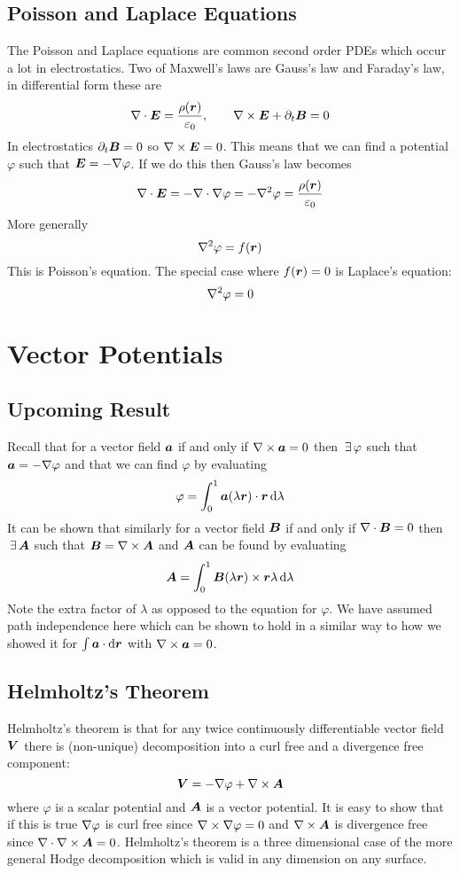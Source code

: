 \documentclass{article}
\begin{document}
    \subsection{Poisson and Laplace Equations}
    The Poisson and Laplace equations are common second order PDEs which occur a lot in electrostatics.
    Two of Maxwell's laws are Gauss's law and Faraday's law, in differential form these are
    \[\nabla\cdot\bm{E} = \frac{\rho(\bm{r})}{\varepsilon_0},\qquad \nabla\times\bm{E} + \partial_t\bm{B} = 0\]
    In electrostatics \(\partial_t\bm{B} = 0\) so \(\nabla\times\bm{E} = 0\).
    This means that we can find a potential \(\varphi\) such that \(\bm{E} = -\nabla\varphi\).
    If we do this then Gauss's law becomes
    \[\div\vv E = -\div\grad\varphi = -\laplacian\varphi = \frac{\rho(\vv r)}{\varepsilon_0}\]
    More generally
    \[\laplacian\varphi = f(\vv r)\]
    This is Poisson's equation.
    The special case where \(f(\bm{r}) = 0\) is Laplace's equation:
    \[\laplacian\varphi = 0\]
    
    \section{Vector Potentials}
    \subsection{Upcoming Result}
    Recall that for a vector field \(\bm{a}\) if and only if \(\nabla\times\bm{a} = 0\) then \(\,\exists\,\varphi\) such that \(\bm{a} = -\nabla\varphi\) and that we can find \(\varphi\) by evaluating
    \[\varphi = \int_0^1\bm{a}(\lambda\bm{r})\cdot\bm{r}\,\dd\lambda\]
    It can be shown that similarly for a vector field \(\bm{B}\) if and only if \(\nabla\cdot\bm{B} = 0\) then \(\,\exists\,\bm{A}\) such that \(\bm{B} = \nabla\times\bm{A}\) and \(\bm{A}\) can be found by evaluating
    \[\bm{A} = \int_0^1\bm{B}(\lambda\bm{r})\times\bm{r}\lambda\,\dd\lambda\]
    Note the extra factor of \(\lambda\) as opposed to the equation for \(\varphi\).
    We have assumed path independence here which can be shown to hold in a similar way to how we showed it for \(\int\bm{a}\cdot\dd\bm{r}\) with \(\nabla\times\bm{a} = 0\).
    
    \subsection{Helmholtz's Theorem}
    Helmholtz's theorem is that for any twice continuously differentiable vector field \(\bm{V}\) there is (non-unique) decomposition into a curl free and a divergence free component:
    \[\bm{V} = -\nabla\varphi + \nabla\times\bm{A}\]
    where \(\varphi\) is a scalar potential and \(\bm{A}\) is a vector potential.
    It is easy to show that if this is true \(\nabla\varphi\) is curl free since \(\nabla\times\nabla\varphi = 0\) and \(\nabla\times\bm{A}\) is divergence free since \(\nabla\cdot\nabla\times\bm{A} = 0\).
    Helmholtz's theorem is a three dimensional case of the more general Hodge decomposition which is valid in any dimension on any surface.
    
\end{document}
